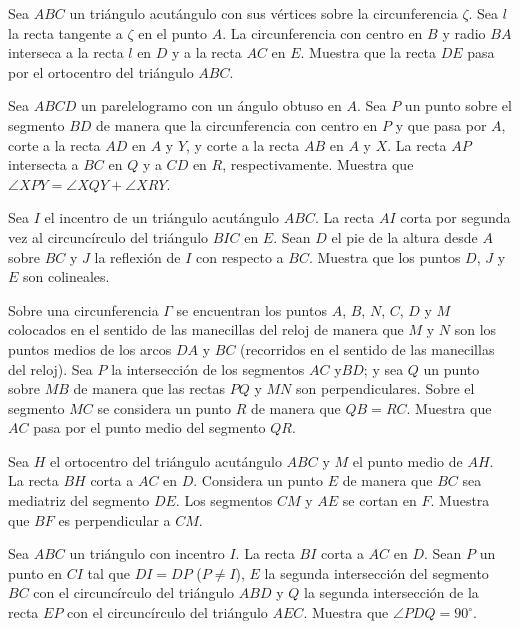 \documentclass[11pt]{scrartcl}
\begin{document}
\begin{problem}
[2011/2] Sea $ABC$ un triángulo acutángulo con sus vértices sobre la circunferencia $\zeta$. Sea $l$ la recta tangente a $\zeta$ en el punto $A$. La circunferencia con centro en $B$ y radio $BA$ interseca a la recta $l$ en $D$ y a la recta $AC$ en $E$. Muestra que la recta $DE$ pasa por el ortocentro del triángulo $ABC$.
\end{problem}

\begin{problem}
[2013/2]Sea $ABCD$ un parelelogramo con un ángulo obtuso en $A$. Sea $P$ un punto sobre el segmento $BD$ de manera que la circunferencia con centro en $P$ y que pasa por $A$, corte a la recta $AD$ en $A$ y $Y$, y corte a la recta $AB$ en $A$ y $X$. La recta $AP$ intersecta a $BC$ en $Q$ y a $CD$ en $R$, respectivamente. Muestra que $\angle XPY = \angle XQY + \angle XRY$.
\end{problem}

\begin{problem}
[2015/5]Sea $I$ el incentro de un triángulo acutángulo $ABC$. La recta $AI$ corta por segunda vez al circuncírculo del triángulo $BIC$ en $E$. Sean $D$ el pie de la altura desde $A$ sobre $BC$ y $J$ la reflexión de $I$ con respecto a $BC$. Muestra que los puntos $D$, $J$ y $E$ son colineales.
\end{problem}

\begin{problem}
[2017/5]Sobre una circunferencia $\Gamma$ se encuentran los puntos $A$, $B$, $N$, $C$, $D$ y $M$ colocados en el sentido de las manecillas del reloj de manera que $M$ y $N$ son los puntos medios de los arcos $DA$ y $BC$ (recorridos en el sentido de las manecillas del reloj). Sea $P$ la intersección de los segmentos $AC$ y$BD$; y sea $Q$ un punto sobre $MB$ de manera que las rectas $PQ$ y $MN$ son perpendiculares. Sobre el segmento $MC$ se considera un punto $R$ de manera que $QB = RC$. Muestra que $AC$ pasa por el punto medio del segmento $QR$.
\end{problem}

\begin{problem}
[2019/2]Sea $H$ el ortocentro del triángulo acutángulo $ABC$ y $M$ el punto medio de $AH$. La recta $BH$ corta a $AC$ en $D$. Considera un punto $E$ de manera que $BC$ sea mediatriz del segmento $DE$. Los segmentos $CM$ y $AE$ se cortan en $F$. Muestra que $BF$ es perpendicular a $CM$.
\end{problem}

\begin{problem}
[2020/2] Sea $ABC$ un triángulo con incentro $I$. La recta $BI$ corta a $AC$ en $D$. Sean $P$ un punto en $CI$ tal que $DI = DP$ ($P \neq I$), $E$ la segunda intersección del segmento $BC$ con el circuncírculo del triángulo $ABD$ y $Q$ la segunda intersección de la recta $EP$ con el circuncírculo del triángulo $AEC$. Muestra que $\angle PDQ = 90^{\circ}$.
\end{problem}
\end{document}
